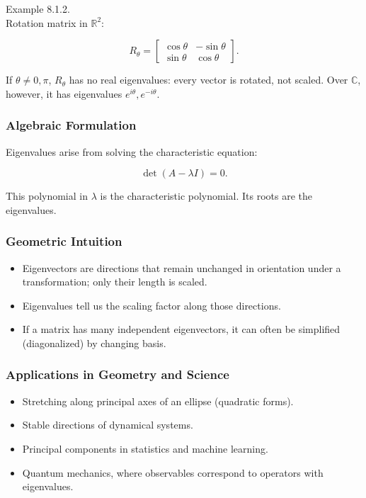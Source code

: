 \documentclass[
  12pt,
  a4paper,
]{article}
\begin{document}
Example 8.1.2.\\
Rotation matrix in \(\mathbb{R}^2\):

\[R_\theta = \begin{bmatrix} \cos\theta & -\sin\theta \\ \sin\theta & \cos\theta \end{bmatrix}.\]

If \(\theta \neq 0, \pi\), \(R_\theta\) has no real eigenvalues: every
vector is rotated, not scaled. Over \(\mathbb{C}\), however, it has
eigenvalues \(e^{i\theta}, e^{-i\theta}\).

\subsubsection{Algebraic Formulation}\label{algebraic-formulation}

Eigenvalues arise from solving the characteristic equation:

\[\det(A - \lambda I) = 0.\]

This polynomial in \(\lambda\) is the characteristic polynomial. Its
roots are the eigenvalues.

\subsubsection{Geometric Intuition}\label{geometric-intuition}

\begin{itemize}
\item
  Eigenvectors are directions that remain unchanged in orientation under
  a transformation; only their length is scaled.
\item
  Eigenvalues tell us the scaling factor along those directions.
\item
  If a matrix has many independent eigenvectors, it can often be
  simplified (diagonalized) by changing basis.
\end{itemize}

\subsubsection{Applications in Geometry and
Science}\label{applications-in-geometry-and-science}

\begin{itemize}
\item
  Stretching along principal axes of an ellipse (quadratic forms).
\item
  Stable directions of dynamical systems.
\item
  Principal components in statistics and machine learning.
\item
  Quantum mechanics, where observables correspond to operators with
  eigenvalues.
\end{itemize}
\end{document}
